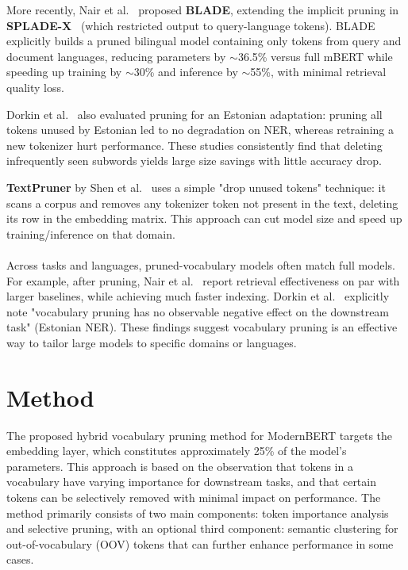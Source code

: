 \documentclass[twocolumn]{article}
\begin{document}
More recently, Nair et al.~\cite{nair2023blade} proposed \textbf{BLADE}, extending the implicit pruning in \textbf{SPLADE-X}~\cite{formal2023spladex} (which restricted output to query-language tokens). BLADE explicitly builds a pruned bilingual model containing only tokens from query and document languages, reducing parameters by $\sim$36.5\% versus full mBERT while speeding up training by $\sim$30\% and inference by $\sim$55\%, with minimal retrieval quality loss.

Dorkin et al.~\cite{dorkin2025estonian} also evaluated pruning for an Estonian adaptation: pruning all tokens unused by Estonian led to no degradation on NER, whereas retraining a new tokenizer hurt performance. These studies consistently find that deleting infrequently seen subwords yields large size savings with little accuracy drop.

\textbf{TextPruner} by Shen et al.~\cite{shen2022textpruner} uses a simple "drop unused tokens" technique: it scans a corpus and removes any tokenizer token not present in the text, deleting its row in the embedding matrix. This approach can cut model size and speed up training/inference on that domain.
\\ \\
Across tasks and languages, pruned-vocabulary models often match full models. For example, after pruning, Nair et al.~\cite{nair2023blade} report retrieval effectiveness on par with larger baselines, while achieving much faster indexing. Dorkin et al.~\cite{dorkin2025estonian} explicitly note "vocabulary pruning has no observable negative effect on the downstream task" (Estonian NER). These findings suggest vocabulary pruning is an effective way to tailor large models to specific domains or languages.

\newpage
\section{Method}
The proposed hybrid vocabulary pruning method for ModernBERT targets the embedding layer, which constitutes approximately 25\% of the model's parameters. This approach is based on the observation that tokens in a vocabulary have varying importance for downstream tasks, and that certain tokens can be selectively removed with minimal impact on performance. The method primarily consists of two main components: token importance analysis and selective pruning, with an optional third component: semantic clustering for out-of-vocabulary (OOV) tokens that can further enhance performance in some cases.
\end{document}
